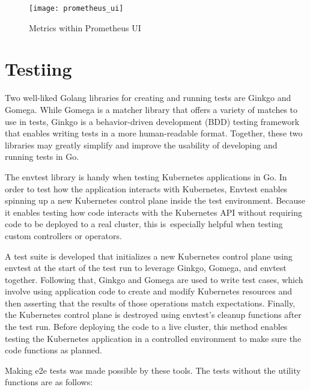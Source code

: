 \begin{figure}[H]
	\centering
	\texttt{[image: prometheus\_ui]}
	\label{fig:prometheus_ui}
	\caption{Metrics within Prometheus UI}
\end{figure}

\section{Testiing}

Two well-liked Golang libraries for creating and running tests are Ginkgo and Gomega. While Gomega is a matcher library that offers a variety of matches to use in tests, Ginkgo is a behavior-driven development (BDD) testing framework that enables writing tests in a more human-readable format. Together, these two libraries may greatly simplify and improve the usability of developing and running tests in Go.

The envtest library is handy when testing Kubernetes applications in Go. In order to test how the application interacts with Kubernetes, Envtest enables spinning up a new Kubernetes control plane inside the test environment. Because it enables testing how code interacts with the Kubernetes API without requiring code to be deployed to a real cluster, this is especially helpful when testing custom controllers or operators.

A test suite is developed that initializes a new Kubernetes control plane using envtest at the start of the test run to leverage Ginkgo, Gomega, and envtest together. Following that, Ginkgo and Gomega are used to write test cases, which involve using application code to create and modify Kubernetes resources and then asserting that the results of those operations match expectations. Finally, the Kubernetes control plane is destroyed using envtest's cleanup functions after the test run. Before deploying the code to a live cluster, this method enables testing the Kubernetes application in a controlled environment to make sure the code functions as planned.

Making e2e tests was made possible by these tools. The tests without the utility functions are as follows:

